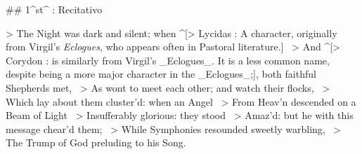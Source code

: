 ## 1^st^ \mvmt: Recitativo


> The Night was dark and silent; when ^[> Lycidas : A character, originally from Virgil's \textit{Eclogues}, who appears often in Pastoral literature.] \
> And ^[> Corydon : is similarly from Virgil's _Eclogues_. It is a less common name, despite being a more major character in the _Eclogues_;], both faithful Shepherds met,  \
> As wont to meet each other; and watch their flocks,  \
> Which lay about them cluster’d: when an Angel  \
> From Heav’n descended on a Beam of Light  \
> Insufferably glorious: they stood  \
> Amaz’d: but he with this message chear’d them;  \
> While Symphonies resounded sweetly warbling,  \
> The Trump of God preluding to his Song.


